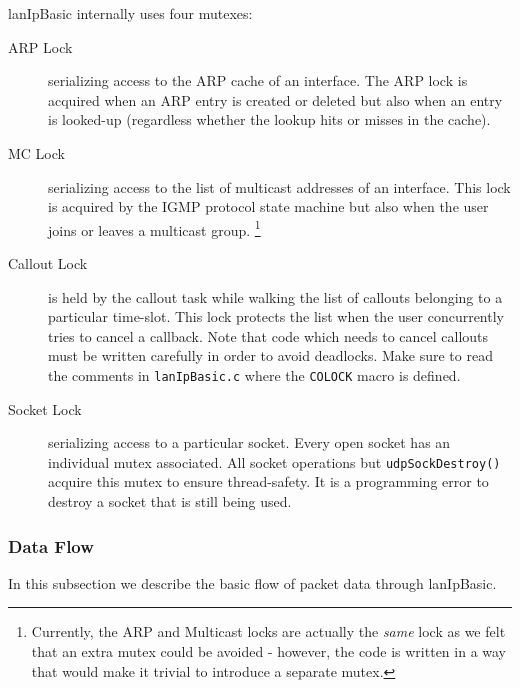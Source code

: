 \documentclass{article}
\newcommand{\lip}{lanIpBasic}
\newcommand{\lipc}[1]{{\tt #1}}
\newcommand{\lipf}[1]{{\tt #1}}
\begin{document}
\lip{} internally uses four mutexes:
\begin{description}
\item[ARP Lock] serializing access to the ARP cache of an interface.
The ARP lock is acquired when an ARP entry is created or deleted but
also when an entry is looked-up (regardless whether the lookup
hits or misses in the cache).
\item[MC Lock] serializing access to the list of multicast addresses
of an interface. This lock is acquired by the IGMP protocol state machine
but also when the user joins or leaves a multicast group.%
\footnote{Currently, the ARP and Multicast locks are actually the {\em same}
  lock as we felt that an extra mutex could be avoided - however, the code
  is written in a way that would make it trivial to introduce a separate
  mutex.}
\item[Callout Lock] is held by the callout task while walking the list
of callouts belonging to a particular time-slot. This lock protects
the list when the user concurrently tries to cancel a callback.
Note that code which needs to cancel callouts must be written
carefully in order to avoid deadlocks. Make sure to read the comments
in \lipf{lanIpBasic.c} where the \lipc{COLOCK} macro is defined.
\item[Socket Lock] serializing access to a particular socket. Every
open socket has an individual mutex associated. All socket operations
but \lipc{udpSockDestroy()} acquire this mutex to ensure thread-safety.
It is a programming error to destroy a socket that is still being used.
\end{description}

    \subsubsection{Data Flow}
In this subsection we describe the basic flow of packet data
through \lip{}.
\end{document}
